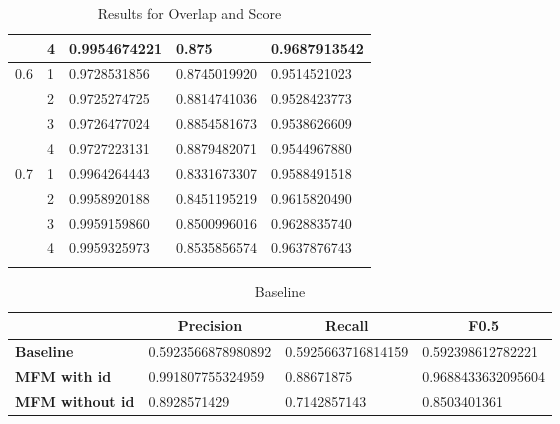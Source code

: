 \begin{longtable}{l|l|l|l|l}
					 & 4 & 0.9954674221 & 0.875        & 0.9687913542 \\ \hline
 \hline
\multirow{4}{*}{0.6} & 1 & 0.9728531856 & 0.8745019920 & 0.9514521023 \\ \hhline{~----}
					 & 2 & 0.9725274725 & 0.8814741036 & 0.9528423773 \\ \hhline{~----}
					 & 3 & 0.9726477024 & 0.8854581673 & 0.9538626609 \\ \hhline{~----}
					 & 4 & 0.9727223131 & 0.8879482071 & 0.9544967880 \\ \hline
 \hline
\multirow{4}{*}{0.7} & 1 & 0.9964264443 & 0.8331673307 & 0.9588491518 \\ \hhline{~----}
					 & 2 & 0.9958920188 & 0.8451195219 & 0.9615820490 \\ \hhline{~----}
					 & 3 & 0.9959159860 & 0.8500996016 & 0.9628835740 \\ \hhline{~----}
					 & 4 & 0.9959325973 & 0.8535856574 & 0.9637876743 \\ \hline

\caption{Results for Overlap and Score}
\label{tab_overlapScore}
\end{longtable}



\begin{table}[h!]
\centering
\begin{tabular}{l||l|l|l}
 &  \multicolumn{1}{|c|}{\bfseries Precision} &  \multicolumn{1}{|c|}{\bfseries Recall} &  \multicolumn{1}{|c}{\bfseries F0.5}
\\ \hline \hline

\textbf{Baseline}       & 0.5923566878980892 & 0.5925663716814159 & 0.592398612782221 \\ \hline
\textbf{MFM with id}    & 0.991807755324959 & 0.88671875 & 0.9688433632095604 \\ \hline
\textbf{MFM without id} & 0.8928571429 & 0.7142857143 & 0.8503401361 \\

\end{tabular}
\caption{Baseline}
\end{table}

